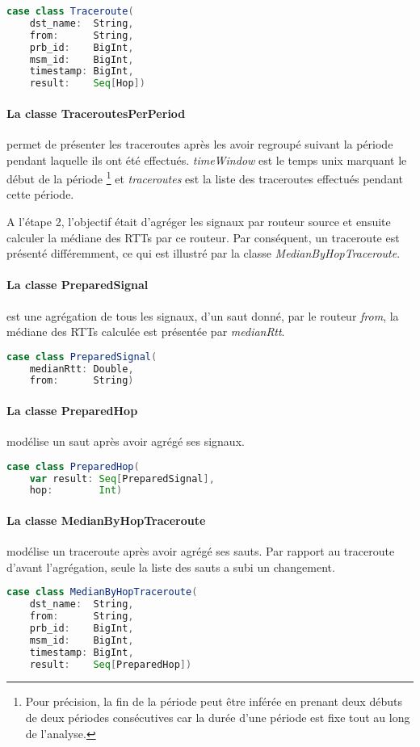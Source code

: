 \begin{lstlisting}[language=scala, caption={La classe Traceroute en Scala }]
case class Traceroute(
	dst_name:  String,
	from:      String,
	prb_id:    BigInt,
	msm_id:    BigInt,
	timestamp: BigInt,
	result:    Seq[Hop])
\end{lstlisting}
\paragraph{La classe TraceroutesPerPeriod} permet de présenter les traceroutes après les avoir regroupé    suivant la période pendant laquelle ils ont été effectués.   \textit{timeWindow} est le temps unix marquant le début de la période \footnote{Pour précision, la fin de la période peut être inférée en prenant deux débuts de deux périodes consécutives car la durée d'une période est fixe tout au long de l'analyse.} et  \textit{traceroutes} est la liste des traceroutes effectués pendant cette période. 


A l'étape 2, l'objectif était d'agréger  les signaux par routeur source et ensuite calculer la médiane des RTTs par ce routeur. Par conséquent, un traceroute est présenté différemment, ce qui est  illustré par la classe \textit{MedianByHopTraceroute}.

\paragraph{La classe PreparedSignal }  est une agrégation de tous les signaux, d'un saut donné, par le routeur \textit{from},  la médiane des RTTs calculée est présentée par \textit{medianRtt}.
\begin{lstlisting}[language=scala, caption={La classe PreparedSignal en Scala }]
case class PreparedSignal(
	medianRtt: Double,
	from:      String)
\end{lstlisting}
\paragraph{La classe PreparedHop } modélise un saut après avoir agrégé ses signaux. 
\begin{lstlisting}[language=scala, caption={La classe PreparedHop en Scala }]
case class PreparedHop(
	var result: Seq[PreparedSignal],
	hop:        Int)
\end{lstlisting}


\paragraph{La classe MedianByHopTraceroute } modélise un traceroute après avoir agrégé ses sauts. Par rapport au traceroute d'avant l'agrégation, seule la liste des sauts  a subi un changement. 
\begin{lstlisting}[language=scala, caption={La classe MedianByHopTraceroute en Scala }]
case class MedianByHopTraceroute(
	dst_name:  String,
	from:      String,
	prb_id:    BigInt,
	msm_id:    BigInt,
	timestamp: BigInt,
	result:    Seq[PreparedHop])
\end{lstlisting}


